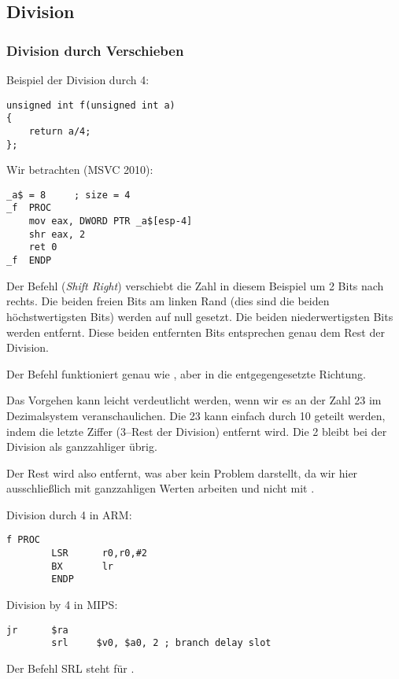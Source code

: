 \subsection{Division}

\subsubsection{Division durch Verschieben}
\label{division_by_shifting}

Beispiel der Division durch 4:

\begin{lstlisting}[style=customc]
unsigned int f(unsigned int a)
{
	return a/4;
};
\end{lstlisting}

Wir betrachten (MSVC 2010):

\begin{lstlisting}[caption=MSVC 2010,style=customasmx86]
_a$ = 8		; size = 4
_f	PROC
	mov	eax, DWORD PTR _a$[esp-4]
	shr	eax, 2
	ret	0
_f	ENDP
\end{lstlisting}

\label{SHR}

Der Befehl \SHR (\emph{Shift Right}) verschiebt die Zahl in diesem Beispiel um 2
Bits nach rechts. Die beiden freien Bits am linken Rand (dies sind die beiden
höchstwertigsten Bits) werden auf null gesetzt. 
Die beiden niederwertigsten Bits werden entfernt. 
Diese beiden entfernten Bits entsprechen genau dem Rest der Division.


Der \SHR Befehl funktioniert genau wie \SHL, aber in die entgegengesetzte
Richtung.


Das Vorgehen kann leicht verdeutlicht werden, wenn wir es an der Zahl 23 im
Dezimalsystem veranschaulichen. Die 23 kann einfach durch 10 geteilt werden,
indem die letzte Ziffer (3--Rest der Division) entfernt wird. Die 2 bleibt bei
der Division als ganzzahliger  übrig.

Der Rest wird also entfernt, was aber kein Problem darstellt, da wir hier
ausschließlich mit ganzzahligen Werten arbeiten und nicht mit .

Division durch 4 in ARM:

\begin{lstlisting}[caption=\NonOptimizingKeilVI (\ARMMode),style=customasmARM]
f PROC
        LSR      r0,r0,#2
        BX       lr
        ENDP
\end{lstlisting}

Division by 4 in MIPS:

\begin{lstlisting}[caption=\Optimizing GCC 4.4.5 (IDA),style=customasmMIPS]
        jr      $ra
        srl     $v0, $a0, 2 ; branch delay slot
\end{lstlisting}

Der Befehl SRL steht für .
